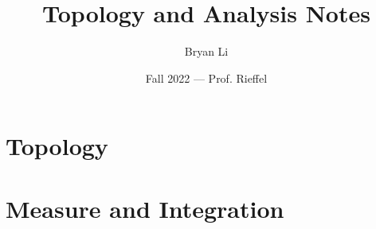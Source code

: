 \documentclass{../mimosis}
\title{Topology and Analysis Notes}
\author{Bryan Li}
\date{Fall 2022 --- Prof. Rieffel}
\begin{document}
    \frontmatter
    \maketitle
    \tableofcontents

    \mainmatter
    \part{Topology}
    
    
    
    
    \part{Measure and Integration}
    
\end{document}
